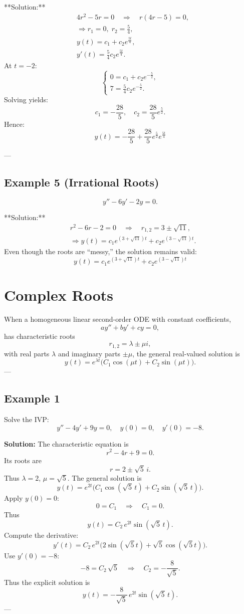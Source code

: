 \documentclass[12pt]{book}
\begin{document}
**Solution:**
\[
\begin{aligned}
&4r^2 - 5r = 0 \quad\Rightarrow\quad r(4r - 5) = 0,\\
&\Rightarrow r_1 = 0, \; r_2 = \tfrac{5}{4},\\
&y(t) = c_1 + c_2 e^{\frac{5t}{4}},\\
&y'(t) = \frac{5}{4}c_2 e^{\frac{5t}{4}}.
\end{aligned}
\]
At \(t = -2\):
\[
\begin{cases}
0 = c_1 + c_2 e^{-\frac{5}{2}}, \\
7 = \tfrac{5}{4}c_2 e^{-\frac{5}{2}}.
\end{cases}
\]
Solving yields:
\[
c_1 = -\frac{28}{5}, \quad c_2 = \frac{28}{5}e^{\frac{5}{2}}.
\]
Hence:
\[
\boxed{y(t) = -\frac{28}{5} + \frac{28}{5}e^{\frac{5}{2}} e^{\frac{5t}{4}}}
\]

---

\subsection*{Example 5 (Irrational Roots)}
\[
y'' - 6y' - 2y = 0.
\]

**Solution:**
\[
\begin{aligned}
&r^2 - 6r -2 = 0\quad\Rightarrow\quad r_{1,2} = 3 \pm \sqrt{11}, \\
&\Rightarrow y(t) = c_1 e^{(3 + \sqrt{11})t} + c_2 e^{(3 - \sqrt{11})t}.
\end{aligned}
\]
Even though the roots are “messy,” the solution remains valid:
\[
\boxed{y(t) = c_1 e^{(3 + \sqrt{11})t} + c_2 e^{(3 - \sqrt{11})t}}
\]

\section{Complex Roots}

When a homogeneous linear second-order ODE with constant coefficients,
\[
a y'' + b y' + c y = 0,
\]
has characteristic roots
\[
r_{1,2} = \lambda \pm \mu i,
\]
with real parts \(\lambda\) and imaginary parts \(\pm\mu\), the general real-valued solution is
\[
y(t) = e^{\lambda t} \bigl(C_1 \cos(\mu t) + C_2 \sin(\mu t)\bigr).
\]
---

\subsection*{Example 1}
Solve the IVP:
\[
y'' - 4y' + 9y = 0, \quad y(0) = 0, \quad y'(0) = -8.
\]

\textbf{Solution:}
The characteristic equation is
\[
r^2 - 4r + 9 = 0.
\]
Its roots are
\[
r = 2 \pm \sqrt{5}\,i.
\]
Thus \(\lambda=2\), \(\mu=\sqrt{5}\). The general solution is
\[
y(t) = e^{2t} \bigl(C_1 \cos(\sqrt{5}\,t) + C_2 \sin(\sqrt{5}\,t)\bigr).
\]
Apply \(y(0)=0\):
\[
0 = C_1 \quad \Rightarrow \quad C_1 = 0.
\]
Thus
\[
y(t) = C_2\,e^{2t} \sin(\sqrt{5}\,t).
\]
Compute the derivative:
\[
y'(t) = C_2\,e^{2t}\bigl(2\sin(\sqrt{5}t) + \sqrt{5}\cos(\sqrt{5}t)\bigr).
\]
Use \(y'(0) = -8\):
\[
-8 = C_2\,\sqrt{5} \quad \Rightarrow \quad C_2 = -\frac{8}{\sqrt{5}}.
\]
Thus the explicit solution is
\[
\boxed{y(t) = -\frac{8}{\sqrt{5}}\,e^{2t}\sin(\sqrt{5}\,t)}.
\]
---
\end{document}

